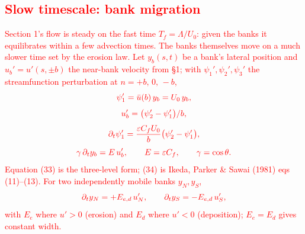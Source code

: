 \documentclass[11pt]{article}
\newcommand{\R}[1]{\textcolor{red}{#1}}
\begin{document}
\R{\section{Slow timescale: bank migration}}

\R{Section 1's flow is steady on the fast time $T_f=\Lambda/U_0$: given the banks
it equilibrates within a few advection times. The banks themselves move on a much
slower time set by the erosion law. Let $y_b(s,t)$ be a bank's lateral position
and $u_b'=u'(s,\pm b)$ the near-bank velocity from §1; with
$\psi_1',\psi_2',\psi_3'$ the streamfunction perturbation at $n=+b,\,0,\,-b$,}
\begin{equation}
\R{\psi_1'=\bar u(b)\,y_b=U_0\,y_b ,}
\end{equation}
\begin{equation}
\R{u_b'=\bigl(\psi_2'-\psi_1'\bigr)/b ,}
\end{equation}
\begin{equation}
\R{\partial_t\psi_1'=\frac{\varepsilon C_fU_0}{b}\bigl(\psi_2'-\psi_1'\bigr) ,}
\end{equation}
\begin{equation}
\R{\gamma\,\partial_t y_b=E\,u_b' ,\qquad E=\varepsilon C_f ,\qquad
\gamma=\cos\theta .}
\end{equation}
\R{Equation (33) is the three-level form; (34) is Ikeda, Parker \& Sawai
(1981) eqs (11)--(13). For two independently mobile banks $y_N,y_S$,}
\begin{equation}
\R{\partial_t y_N=+E_{e,d}\,u_N' ,\qquad
   \partial_t y_S=-E_{e,d}\,u_S' ,}
\end{equation}
\R{with $E_e$ where $u'>0$ (erosion) and $E_d$ where $u'<0$ (deposition);
$E_e=E_d$ gives constant width.}
\end{document}
